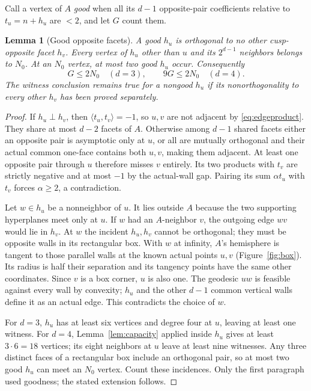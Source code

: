 \documentclass[11pt]{article}
\newtheorem{lemma}[theorem]{Lemma}
\theoremstyle{remark}
\newcommand{\ip}[2]{\langle #1,#2\rangle}
\begin{document}
Call a vertex of $A$ \emph{good} when all its $d-1$ opposite-pair
coefficients relative to $t_u=n+h_u$ are $<2$, and let $G$ count them.
\begin{lemma}[Good opposite facets]\label{lem:goodwitness}
A good $h_u$ is orthogonal to no other cusp-opposite facet $h_v$.
Every vertex of $h_u$ other than $u$ and its $2^{d-1}$ neighbors belongs
to $N_0$. At an $N_0$ vertex, at most two good $h_u$ occur. Consequently
\begin{equation}\label{eq:goodwitness}
 G\le2N_0\quad(d=3),\qquad 9G\le2N_0\quad(d=4).
\end{equation}
The witness conclusion remains true for a nongood $h_u$ if its
nonorthogonality to every other $h_v$ has been proved separately.
\end{lemma}
\begin{proof}
If $h_u\perp h_v$, then $\ip{t_u}{t_v}=-1$, so $u,v$ are not
adjacent by \eqref{eq:edgeproduct}. They share at most $d-2$ facets
of $A$. Otherwise among $d-1$ shared facets either an opposite pair
is asymptotic only at $u$, or all are mutually orthogonal and their
actual common one-face contains both $u,v$, making them adjacent.
At least one opposite pair through $u$ therefore misses $v$ entirely.
Its two products with $t_v$ are strictly negative and at most $-1$
by the actual-wall gap. Pairing its sum $\alpha t_u$ with $t_v$
forces $\alpha\ge2$, a contradiction.

Let $w\in h_u$ be a nonneighbor of $u$. It lies outside $A$ because
the two supporting hyperplanes meet only at $u$. If $w$ had an
$A$-neighbor $v$, the outgoing edge $wv$ would lie in $h_v$.
At $w$ the incident $h_u,h_v$ cannot be orthogonal; they must be
opposite walls in its rectangular box. With $w$ at infinity,
$A$'s hemisphere is tangent to those parallel walls at the known
actual points $u,v$ (Figure~\ref{fig:box}). Its radius is half their
separation and its tangency points have the same other coordinates.
Since $v$ is a box corner, $u$ is also one. The geodesic $uw$ is
feasible against every wall by convexity; $h_u$ and the other
$d-1$ common vertical walls define it as an actual edge. This
contradicts the choice of $w$.

For $d=3$, $h_u$ has at least six vertices and degree four at $u$,
leaving at least one witness. For $d=4$, Lemma~\ref{lem:capacity}
applied inside $h_u$ gives at least $3\cdot6=18$ vertices; its eight
neighbors at $u$ leave at least nine witnesses. Any three distinct
faces of a rectangular box include an orthogonal pair, so at most
two good $h_u$ can meet an $N_0$ vertex. Count these incidences.
Only the first paragraph used goodness; the stated extension follows.
\end{proof}
\end{document}
